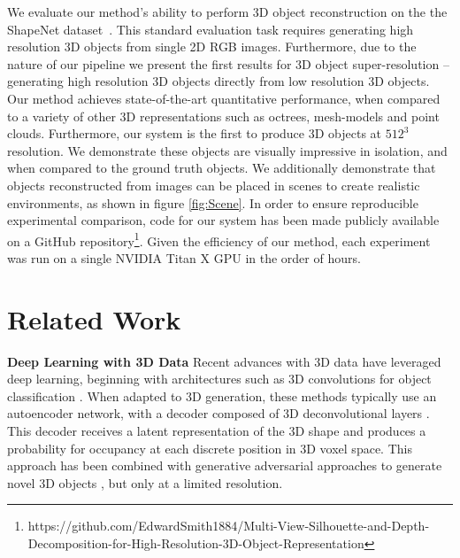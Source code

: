 \documentclass{article}
\begin{document}
We evaluate our method's ability to perform 3D object reconstruction on the the ShapeNet dataset~\cite{ShapeNet}. This standard evaluation task requires generating high resolution 3D objects from single 2D RGB images. Furthermore, due to the nature of our pipeline we present the first results for 3D object super-resolution -- generating high resolution 3D objects directly from low resolution 3D objects. Our method achieves state-of-the-art quantitative performance, when compared to a variety of other 3D representations such as octrees, mesh-models and point clouds. 
Furthermore, our system is the first to produce 3D objects at $512^3$ resolution. We demonstrate these objects are visually impressive in isolation, and when compared to the ground truth objects. We additionally demonstrate that objects reconstructed from images can be placed in scenes to create realistic environments, as shown in figure \ref{fig:Scene}. In order to ensure reproducible experimental comparison, code for our system has been made publicly available on a GitHub repository\footnote{https://github.com/EdwardSmith1884/Multi-View-Silhouette-and-Depth-Decomposition-for-High-Resolution-3D-Object-Representation}. Given the efficiency of our method, each experiment was run on a single NVIDIA Titan X GPU in the order of hours. 

\section{Related Work}

\begin{figure*}
\qquad
{}
\centering
\caption{Scene created from objects reconstructed by our method from RGB images at $256^3$ resolution. See the supplementary video for better viewing \url{https://sites.google.com/site/mvdnips2018}.}\label{fig:Scene}
\end{figure*}

\textbf{Deep Learning with 3D Data} \quad Recent advances with 3D data have leveraged deep learning, beginning with architectures such as 3D convolutions for object classification \cite{maturana2015voxnet, li2016fpnn}. 
When adapted to 3D generation, these methods typically use an autoencoder network, with a decoder composed of 3D deconvolutional layers \cite{choy20163d,3DGAN}. This decoder receives a latent representation of the 3D shape and produces a probability for occupancy at each discrete position in 3D voxel space. This approach has been combined with generative adversarial approaches \cite{GAN} to generate novel 3D objects \cite{3DGAN, 3DIWGAN, liu2017interactive}, but only at a limited resolution.
\end{document}
